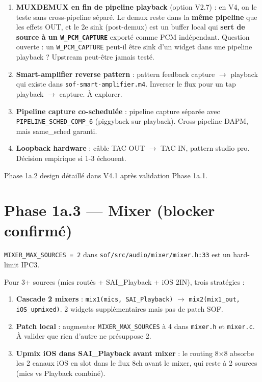 \documentclass[11pt,a4paper]{article}
\begin{document}
\begin{enumerate}[leftmargin=*, itemsep=2pt]
  \item \textbf{MUXDEMUX en fin de pipeline playback} (option V2.7) : en V4, on le teste sans cross-pipeline séparé. Le demux reste dans la \textbf{même pipeline} que les effets OUT, et le 2e sink (post-demux) est un buffer local qui \textbf{sert de source à un \texttt{W\_PCM\_CAPTURE}} exporté comme PCM indépendant.
  Question ouverte : un \texttt{W\_PCM\_CAPTURE} peut-il être sink d'un widget dans une pipeline playback ? Upstream peut-être jamais testé.
  \item \textbf{Smart-amplifier reverse pattern} : pattern feedback capture $\to$ playback qui existe dans \texttt{sof-smart-amplifier.m4}. Inverser le flux pour un tap playback $\to$ capture. À explorer.
  \item \textbf{Pipeline capture co-schedulée} : pipeline capture séparée avec \texttt{PIPELINE\_SCHED\_COMP\_6} (piggyback sur playback). Cross-pipeline DAPM, mais same\_sched garanti.
  \item \textbf{Loopback hardware} : câble TAC OUT $\to$ TAC IN, pattern studio pro. Décision empirique si 1-3 échouent.
\end{enumerate}

Phase 1a.2 design détaillé dans V4.1 après validation Phase 1a.1.

\section{Phase 1a.3 --- Mixer (blocker confirmé)}

\texttt{MIXER\_MAX\_SOURCES = 2} dans \texttt{sof/src/audio/mixer/mixer.h:33} est un hard-limit IPC3.

Pour 3+ sources (mics routés + SAI\_Playback + iOS 2IN), trois stratégies :

\begin{enumerate}[leftmargin=*, itemsep=1pt]
  \item \textbf{Cascade 2 mixers} : \texttt{mix1(mics, SAI\_Playback)} $\to$ \texttt{mix2(mix1\_out, iOS\_upmixed)}. 2 widgets supplémentaires mais pas de patch SOF.
  \item \textbf{Patch local} : augmenter \texttt{MIXER\_MAX\_SOURCES} à 4 dans \texttt{mixer.h} et \texttt{mixer.c}. À valider que rien d'autre ne présuppose 2.
  \item \textbf{Upmix iOS dans SAI\_Playback avant mixer} : le routing 8×8 absorbe les 2 canaux iOS en slot dans le flux 8ch avant le mixer, qui reste à 2 sources (mics vs Playback combiné).
\end{enumerate}
\end{document}
